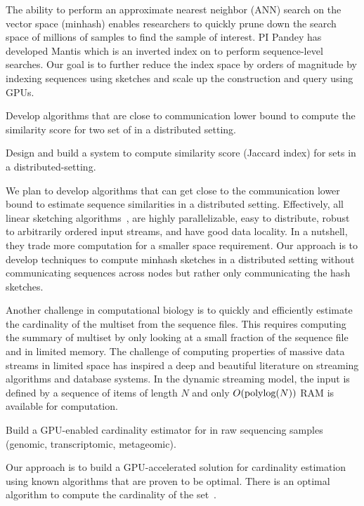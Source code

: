 The ability to perform an approximate nearest neighbor (ANN) search on the vector space (minhash) enables researchers to quickly prune down the search space of millions of samples to find the sample of interest. PI Pandey has developed Mantis which is an inverted index on \kmers to perform sequence-level searches. Our goal is to further reduce the index space by orders of magnitude by indexing sequences using sketches and scale up the construction and query using GPUs.

\begin{rproblem}
Develop algorithms that are close to communication lower bound to compute the similarity score for two set of \kmers in a distributed setting.
\end{rproblem}

\begin{rproblem}
Design and build a system to compute similarity score (Jaccard index) for \kmer sets in a distributed-setting.
\end{rproblem}

We plan to develop algorithms that can get close to the communication lower bound to estimate sequence similarities in a distributed setting. Effectively, all linear sketching algorithms~\cite{li2014sketchuniversal}, are highly parallelizable, easy to distribute, robust to arbitrarily ordered input streams, and have good data locality. In a nutshell, they trade more computation for a smaller space requirement. Our approach is to develop techniques to compute minhash sketches in a distributed setting without communicating sequences across nodes but rather only communicating the hash sketches.

Another challenge in computational biology is to quickly and efficiently estimate the cardinality of the \kmer multiset from the sequence files. This requires computing the summary of \kmer multiset by only looking at a small fraction of the sequence file and in limited memory.
%
The challenge of computing properties of massive data streams in limited space has inspired a deep and beautiful literature on streaming algorithms and database systems. In the dynamic streaming model, the input is defined by a sequence of items of length $N$ and only $O(\textrm{polylog}{(N)})$ {RAM} is available for computation. 


\begin{rproblem}
Build a GPU-enabled cardinality estimator for \kmers in raw sequencing samples (genomic, transcriptomic, metageomic).
\end{rproblem}


Our approach is to build a GPU-accelerated solution for cardinality estimation using known algorithms that are proven to be optimal. There is an optimal algorithm to compute the cardinality of the set~\cite{Kane2010}. 